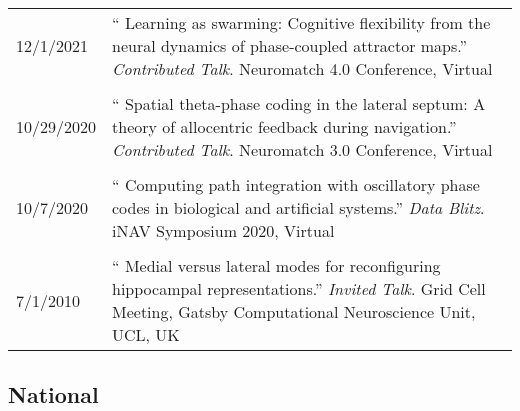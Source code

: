 \documentclass[10pt]{article}
\newcommand{\itemtitle}[1]{{\color{hopkinsblue}\ul{#1}}}
\newcommand{\unpubtitle}[1]{{\color{hopkinsblue} #1}}
\begin{document}
\begin{longtable}{@{\hspace{0.1in}}l>{\raggedright\arraybackslash}p{}}
  \tabularnewline
  12/1/2021 \hspace{0.2in} & ``\unpubtitle{Learning as swarming: Cognitive
  flexibility from the neural dynamics of phase-coupled attractor maps}.''
  \emph{Contributed Talk}. Neuromatch 4.0 Conference, Virtual \\
  \tabularnewline
  10/29/2020 \hspace{0.2in} & ``\unpubtitle{Spatial theta-phase coding in
  the lateral septum: A theory of allocentric feedback during navigation}.''
  \emph{Contributed Talk}. Neuromatch 3.0 Conference, Virtual \\
  \tabularnewline
  10/7/2020 \hspace{0.2in} & ``\unpubtitle{Computing path integration with
  oscillatory phase codes in biological and artificial systems}.'' \emph{Data
  Blitz}. iNAV Symposium 2020, Virtual \\
  \tabularnewline
  7/1/2010 \hspace{0.2in} & ``\unpubtitle{Medial versus lateral modes for
  reconfiguring hippocampal representations}.'' \emph{Invited Talk}. Grid
  Cell Meeting, Gatsby Computational Neuroscience Unit, UCL, UK \\
\end{longtable}


\smallskip
\subsection*{National}
\label{talks:natl}
\end{document}
